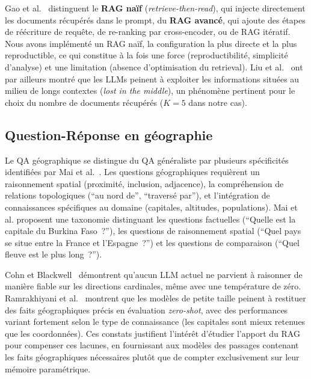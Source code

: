 \documentclass[12pt,a4paper]{article}
\begin{document}
Gao et al.~\cite{gao2023ragsurvey} distinguent le \textbf{RAG na\"if} (\textit{retrieve-then-read}), qui injecte directement les documents r\'ecup\'er\'es dans le prompt, du \textbf{RAG avanc\'e}, qui ajoute des \'etapes de r\'e\'ecriture de requ\^ete, de re-ranking par cross-encoder, ou de RAG it\'eratif. Nous avons impl\'ement\'e un RAG na\"if, la configuration la plus directe et la plus reproductible, ce qui constitue \`a la fois une force (reproductibilit\'e, simplicit\'e d'analyse) et une limitation (absence d'optimisation du retrieval). Liu et al.~\cite{liu2023lost} ont par ailleurs montr\'e que les LLMs peinent \`a exploiter les informations situ\'ees au milieu de longs contextes (\textit{lost in the middle}), un ph\'enom\`ene pertinent pour le choix du nombre de documents r\'ecup\'er\'es ($K = 5$ dans notre cas).

\subsection{Question-R\'eponse en g\'eographie}

Le QA g\'eographique se distingue du QA g\'en\'eraliste par plusieurs sp\'ecificit\'es identifi\'ees par Mai et al.~\cite{mai_geographic_2021}. Les questions g\'eographiques requi\`erent un raisonnement spatial (proximit\'e, inclusion, adjacence), la compr\'ehension de relations topologiques (``au nord de'', ``travers\'e par''), et l'int\'egration de connaissances sp\'ecifiques au domaine (capitales, altitudes, populations). Mai et al. proposent une taxonomie distinguant les questions factuelles (``Quelle est la capitale du Burkina Faso~?''), les questions de raisonnement spatial (``Quel pays se situe entre la France et l'Espagne~?'') et les questions de comparaison (``Quel fleuve est le plus long~?'').

Cohn et Blackwell~\cite{cohn_evaluating_2024} d\'emontrent qu'aucun LLM actuel ne parvient \`a raisonner de mani\`ere fiable sur les directions cardinales, m\^eme avec une temp\'erature de z\'ero. Ramrakhiyani et al.~\cite{ramrakhiyani_zero-shot_2023} montrent que les mod\`eles de petite taille peinent \`a restituer des faits g\'eographiques pr\'ecis en \'evaluation \textit{zero-shot}, avec des performances variant fortement selon le type de connaissance (les capitales sont mieux retenues que les coordonn\'ees). Ces constats justifient l'int\'er\^et d'\'etudier l'apport du RAG pour compenser ces lacunes, en fournissant aux mod\`eles des passages contenant les faits g\'eographiques n\'ecessaires plut\^ot que de compter exclusivement sur leur m\'emoire param\'etrique.
\end{document}
